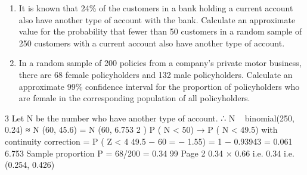 \documentclass[a4paper,12pt]{article}
\begin{document}
\begin{enumerate}
\item It is known that 24\% of the customers in a bank holding a current account also have another type of account with the bank.
Calculate an approximate value for the probability that fewer than 50 customers in a random sample of 250 customers with a current account also have another type of
account.
\item In a random sample of 200 policies from a company’s private motor business, there are 68 female policyholders and 132 male policyholders.
Calculate an approximate 99\% confidence interval for the proportion of policyholders who are female in the corresponding population of all policyholders.
\end{enumerate}
\newpage
3
Let N be the number who have another type of account.
∴ N ~ binomial(250, 0.24) ≈ N (60, 45.6) = N (60, 6.753 2 )
P ( N < 50) → P ( N < 49.5) with continuity correction
= P ( Z <
4
49.5 − 60
= − 1.55) = 1 − 0.93943 = 0.061
6.753
Sample proportion P = 68/200 = 0.34
99%
Page 2
0.34 × 0.66
i.e. 0.34  i.e. (0.254, 0.426)
\end{document}
